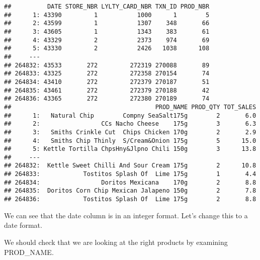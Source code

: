 \documentclass[
]{article}
\newenvironment{Shaded}{\begin{snugshade}}{\end{snugshade}}
\newcommand{\AttributeTok}[1]{\textcolor[rgb]{0.77,0.63,0.00}{#1}}
\newcommand{\DocumentationTok}[1]{\textcolor[rgb]{0.56,0.35,0.01}{\textbf{\textit{#1}}}}
\newcommand{\FunctionTok}[1]{\textcolor[rgb]{0.00,0.00,0.00}{#1}}
\newcommand{\NormalTok}[1]{#1}
\newcommand{\OtherTok}[1]{\textcolor[rgb]{0.56,0.35,0.01}{#1}}
\newcommand{\SpecialCharTok}[1]{\textcolor[rgb]{0.00,0.00,0.00}{#1}}
\newcommand{\StringTok}[1]{\textcolor[rgb]{0.31,0.60,0.02}{#1}}
\begin{document}
\begin{verbatim}
##          DATE STORE_NBR LYLTY_CARD_NBR TXN_ID PROD_NBR
##      1: 43390         1           1000      1        5
##      2: 43599         1           1307    348       66
##      3: 43605         1           1343    383       61
##      4: 43329         2           2373    974       69
##      5: 43330         2           2426   1038      108
##     ---                                               
## 264832: 43533       272         272319 270088       89
## 264833: 43325       272         272358 270154       74
## 264834: 43410       272         272379 270187       51
## 264835: 43461       272         272379 270188       42
## 264836: 43365       272         272380 270189       74
##                                        PROD_NAME PROD_QTY TOT_SALES
##      1:   Natural Chip        Compny SeaSalt175g        2       6.0
##      2:                 CCs Nacho Cheese    175g        3       6.3
##      3:   Smiths Crinkle Cut  Chips Chicken 170g        2       2.9
##      4:   Smiths Chip Thinly  S/Cream&Onion 175g        5      15.0
##      5: Kettle Tortilla ChpsHny&Jlpno Chili 150g        3      13.8
##     ---                                                            
## 264832:  Kettle Sweet Chilli And Sour Cream 175g        2      10.8
## 264833:            Tostitos Splash Of  Lime 175g        1       4.4
## 264834:                 Doritos Mexicana    170g        2       8.8
## 264835:  Doritos Corn Chip Mexican Jalapeno 150g        2       7.8
## 264836:            Tostitos Splash Of  Lime 175g        2       8.8
\end{verbatim}

We can see that the date column is in an integer format. Let's change
this to a date format.

\begin{Shaded}
\end{Shaded}

We should check that we are looking at the right products by examining
PROD\_NAME.
\end{document}
